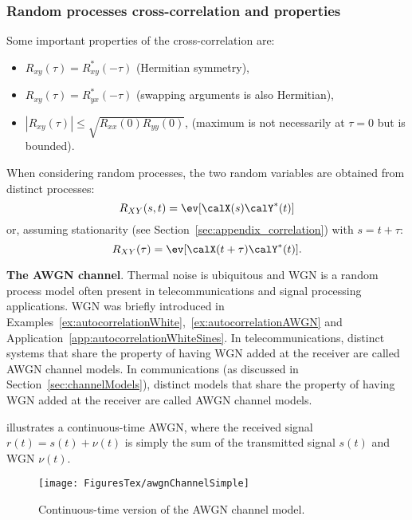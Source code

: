 \subsubsection{{\akadvanced} Random processes cross-correlation and properties}

Some important properties of the cross-correlation are:
\begin{itemize}
	\item $R_{xy}(\tau)=R_{xy}^*(-\tau)$ (Hermitian symmetry),
	\item $R_{xy}(\tau)=R_{yx}^*(-\tau)$ (swapping arguments is also Hermitian),
	\item $|R_{xy}(\tau)| \le \sqrt{R_{xx}(0) R_{yy}(0)}$, (maximum is not necessarily at $\tau=0$ but is bounded).
\end{itemize}

When considering random processes, the two random variables are obtained from distinct processes:
\begin{equation}
R_{XY}(s,t) = \ev[\calX(s) \calY^*(t)]
\end{equation}
or, assuming stationarity (see Section~\ref{sec:appendix_correlation}) with $s=t+\tau$:
\begin{equation}
R_{XY}(\tau) = \ev[\calX(t+\tau) \calY^*(t)].
	\label{eq:crosscorrelation}
\end{equation}

\bExample \textbf{The AWGN channel}.
\label{ex:AWGNchannelIntroduction}
Thermal noise is ubiquitous and WGN is a random process model often present in telecommunications and signal processing applications.  WGN was briefly introduced in Examples~\ref{ex:autocorrelationWhite},~\ref{ex:autocorrelationAWGN} and Application~\ref{app:autocorrelationWhiteSines}. 
\ifml
In telecommunications, distinct systems that share the property of having WGN added at the receiver are called AWGN channel models.
\else
In communications  (as discussed in Section~\ref{sec:channelModels}), distinct models that share the property of having WGN added at the receiver are called AWGN channel models.
\fi

 illustrates a continuous-time AWGN, where the received signal $r(t) = s(t) + \nu(t)$ is simply the sum of the transmitted signal $s(t)$ and WGN $\nu(t)$.

\begin{figure}[htbp]
\centering
\texttt{[image: FiguresTex/awgnChannelSimple]}
\caption{Continuous-time version of the AWGN channel model.\label{fig:awgnChannelSimple}}
\end{figure}

